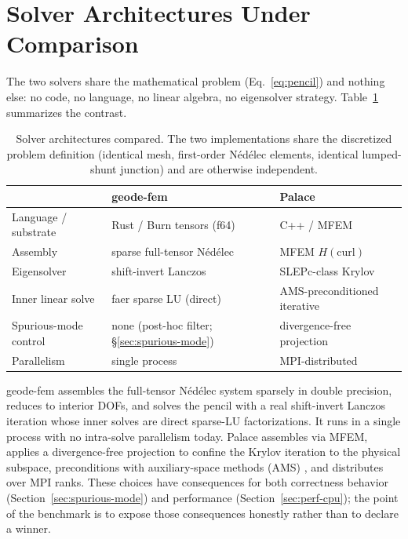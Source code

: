 \documentclass{anvil-paper}
\begin{document}
\section{Solver Architectures Under Comparison}
\label{sec:solvers}

The two solvers share the mathematical problem
(Eq.~\ref{eq:pencil}) and nothing else: no code, no language, no linear
algebra, no eigensolver strategy. Table~\ref{tab:architectures} summarizes
the contrast.

\begin{table}[t]
  \centering
  \caption{Solver architectures compared. The two implementations share the
  discretized problem definition (identical mesh, first-order
  N\'ed\'elec elements, identical lumped-shunt junction) and are otherwise
  independent.}
  \label{tab:architectures}
  \footnotesize
  \setlength{\tabcolsep}{4pt}
  \begin{tabular}{@{}lll@{}}
    \toprule
     & \textbf{geode-fem} & \textbf{Palace} \\
    \midrule
    Language / substrate & Rust / Burn tensors (f64) & C++ / MFEM \\
    Assembly & sparse full-tensor N\'ed\'elec & MFEM $H(\mathrm{curl})$ \\
    Eigensolver & shift-invert Lanczos & SLEPc-class Krylov \\
    Inner linear solve & faer sparse LU (direct) & AMS-preconditioned iterative \\
    Spurious-mode control & none (post-hoc filter; \S\ref{sec:spurious-mode}) &
      divergence-free projection \\
    Parallelism & single process & MPI-distributed \\
    \bottomrule
  \end{tabular}
\end{table}

geode-fem assembles the full-tensor N\'ed\'elec system sparsely in double
precision, reduces to interior DOFs, and solves the pencil with a real
shift-invert Lanczos iteration whose inner solves are direct sparse-LU
factorizations. It runs in a single process with no intra-solve parallelism
today. Palace assembles via MFEM, applies a divergence-free projection to
confine the Krylov iteration to the physical subspace, preconditions with
auxiliary-space methods (AMS)
\citep{hiptmair-xu,tzaniovkolevpanayotsvassilevski2018parallel}, and
distributes over MPI ranks. These choices have consequences for both
correctness behavior (Section~\ref{sec:spurious-mode}) and performance
(Section~\ref{sec:perf-cpu}); the point of the benchmark is to expose those
consequences honestly rather than to declare a winner.
\end{document}
